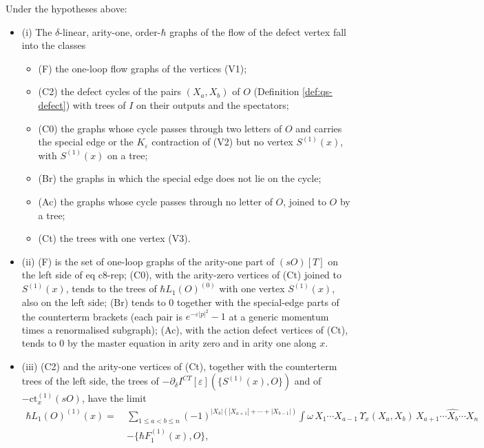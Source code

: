 \begin{theorem}
\label{thm:qs-classes}
Under the hypotheses above:
\begin{itemize}
\item (i) The $\delta$-linear, arity-one, order-$\hbar$ graphs of the flow of the defect vertex fall into the classes
\begin{itemize}
\item (F) the one-loop flow graphs of the vertices (V1);
\item (C2) the defect cycles of the pairs $(X_a,X_b)$ of $O$ (Definition \ref{def:qs-defect}) with trees of $I$ on their outputs and the spectators;
\item (C0) the graphs whose cycle passes through two letters of $O$ and carries the special edge or the $K_\varepsilon$ contraction of (V2) but no vertex $S^{(1)}(x)$, with $S^{(1)}(x)$ on a tree;
\item (Br) the graphs in which the special edge does not lie on the cycle;
\item (Ac) the graphs whose cycle passes through no letter of $O$, joined to $O$ by a tree;
\item (Ct) the trees with one vertex (V3).
\end{itemize}
\item (ii) (F) is the set of one-loop graphs of the arity-one part of $(sO)[T]$ on the left side of eq c8-rep; (C0), with the arity-zero vertices of (Ct) joined to $S^{(1)}(x)$, tends to the trees of $\hbar L_1(O)^{(0)}$ with one vertex $S^{(1)}(x)$, also on the left side; (Br) tends to $0$ together with the special-edge parts of the counterterm brackets (each pair is $e^{-\varepsilon|p|^2}-1$ at a generic momentum times a renormalised subgraph); (Ac), with the action defect vertices of (Ct), tends to $0$ by the master equation in arity zero and in arity one along $x$.
\item (iii) (C2) and the arity-one vertices of (Ct), together with the counterterm trees of the left side, the trees of $-\partial_\delta I^{CT}[\varepsilon](\{S^{(1)}(x),O\})$ and of $-\mathrm{ct}^{(1)}_x(sO)$, have the limit
\begin{equation}
\begin{aligned}
\hbar L_1(O)^{(1)}(x)=\ &\sum_{1\le a<b\le n}(-1)^{|X_b|(|X_{a+1}|+\cdots+|X_{b-1}|)}\int\omega\,X_1\cdots X_{a-1}\,\Upsilon_x(X_a,X_b)\,X_{a+1}\cdots\widehat{X_b}\cdots X_n\\
&-\big\{\hbar F_1^{(1)}(x),O\big\},
\end{aligned}

\end{equation}
\end{itemize}
\end{theorem}
